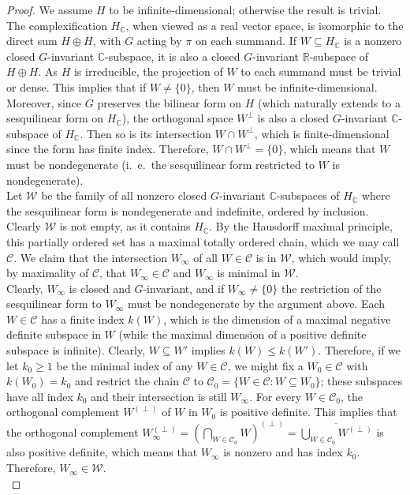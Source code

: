 \documentclass{article}
\theoremstyle{definition}
\theoremstyle{remark}
\theoremstyle{plain}
\begin{document}
\begin{proof}
    We assume $H$ to be infinite-dimensional; otherwise the result is trivial. The complexification $H_\mathbb{C}$, when viewed as a real vector space, is isomorphic to the direct sum $H\oplus H$, with $G$ acting by $\pi$ on each summand. If $W\subseteq H_\mathbb{C}$ is a nonzero closed $G$-invariant $\mathbb{C}$-subspace, it is also a closed $G$-invariant $\mathbb{R}$-subspace of $H\oplus H$. As $H$ is irreducible, the projection of $W$ to each summand must be trivial or dense. This implies that if $W\neq\{0\}$, then $W$ must be infinite-dimensional. Moreover, since $G$ preserves the bilinear form on $H$ (which naturally extends to a sesquilinear form on $H_\mathbb{C}$), the orthogonal space $W^\perp$ is also a closed $G$-invariant $\mathbb{C}$-subspace of $H_{\mathbb{C}}$. Then so is its intersection $W\cap W^\perp$, which is finite-dimensional since the form has finite index. Therefore, $W\cap W^\perp=\{0\}$, which means that $W$ must be nondegenerate (i.~e.~the sesquilinear form restricted to $W$ is nondegenerate). \\

    Let $\mathcal{W}$ be the family of all nonzero closed $G$-invariant $\mathbb{C}$-subspaces of $H_\mathbb{C}$ where the sesquilinear form is nondegenerate and indefinite, ordered by inclusion. Clearly $\mathcal{W}$ is not empty, as it contains $H_\mathbb{C}$. By the Hausdorff maximal principle, this partially ordered set has a maximal totally ordered chain, which we may call $\mathcal{C}$. We claim that the intersection $W_{\infty}$ of all $W\in\mathcal{C}$ is in $\mathcal{W}$, which would imply, by maximality of $\mathcal{C}$, that $W_{\infty}\in\mathcal{C}$ and $W_{\infty}$ is minimal in $\mathcal{W}$. \\
    
    Clearly, $W_{\infty}$ is closed and $G$-invariant, and if $W_{\infty}\neq\{0\}$ the restriction of the sesquilinear form to $W_{\infty}$ must be nondegenerate by the argument above. Each $W\in\mathcal{C}$ has a finite index $k(W)$, which is the dimension of a maximal negative definite subspace in $W$ (while the maximal dimension of a positive definite subspace is infinite). Clearly, $W\subseteq W'$ implies $k(W)\leq k(W')$. Therefore, if we let $k_0\geq 1$ be the minimal index of any $W\in\mathcal{C}$, we might fix a $W_0\in\mathcal{C}$ with $k(W_0)=k_0$ and restrict the chain $\mathcal{C}$ to $\mathcal{C}_0=\{W\in\mathcal{C}: W\subseteq W_0\}$; these subspaces have all index $k_0$ and their intersection is still $W_{\infty}$. For every $W\in\mathcal{C}_0$, the orthogonal complement $W^{(\perp)}$ of $W$ in $W_0$ is positive definite. This implies that the orthogonal complement $W_{\infty}^{(\perp)}=(\bigcap_{W\in\mathcal{C}_0}{W})^{(\perp)}=\overline{\bigcup_{W\in\mathcal{C}_0}{W^{(\perp)}}}$ is also positive definite, which means that $W_{\infty}$ is nonzero and has index $k_0$. Therefore, $W_{\infty}\in\mathcal{W}$. \\


\end{proof}
\end{document}
